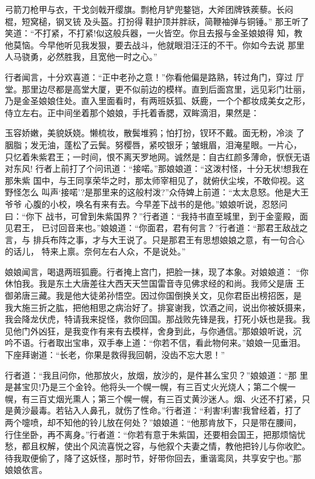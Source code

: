 弓箭刀枪甲与衣，干戈剑戟开缨旗。剽枪月铲兜鍪铠，大斧团牌铁蒺藜。长闷
棍，短窝槌，钢叉铳及头盔。打扮得鞋护顶并胖祆，简鞭袖弹与铜锤。”
那王听了笑道：“不打紧，不打紧!似这般兵器，一火皆空。你且去报与金圣娘娘得
知，教他莫恼。今早他听见我发狠，要去战斗，他就眼泪汪汪的不干。你如今去说
那里人马骁勇，必然胜我，且宽他一时之心。”

行者闻言，十分欢喜道：“正中老孙之意！”你看他偏是路熟，转过角门，穿过
厅堂。那里边尽都是高堂大厦，更不似前边的模样。直到后面宫里，远见彩门壮丽，
乃是金圣娘娘住处。直入里面看时，有两班妖狐、妖鹿，一个个都妆成美女之形，
侍立左右。正中间坐着那个娘娘，手托着香腮，双眸滴泪，果然是：

玉容娇嫩，美貌妖娆。懒梳妆，散鬓堆鸦；怕打扮，钗环不戴。面无粉，冷淡
了胭脂；发无油，蓬松了云鬓。努樱唇，紧咬银牙；皱蛾眉，泪淹星眼。一片心，
只忆着朱紫君王；一时间，恨不离天罗地网。诚然是：自古红颜多薄命，恹恹无语
对东风!
行者上前打了个问讯道：“接喏。”那娘娘道：“这泼村怪，十分无状!想我在那朱紫
国中，与王同享荣华之时，那太师宰相见了，就俯伏尘埃，不敢仰视。这野怪怎么
叫声‘接喏’?是那里来的这般村泼?”众侍婢上前道：“太太息怒。他是大王爷爷
心腹的小校，唤名有来有去。今早差下战书的是他。”娘娘听说，忍怒问曰：“你下
战书，可曾到朱紫国界？”行者道：“我持书直至城里，到于金銮殿，面见君王，
已讨回音来也。”娘娘道：“你面君，君有何言？”行者道：“那君王敌战之言，与
排兵布阵之事，才与大王说了。只是那君王有思想娘娘之意，有一句合心的话儿，
特来上禀。奈何左右人众，不是说处。”

娘娘闻言，喝退两班狐鹿。行者掩上宫门，把脸一抹，现了本象。对娘娘道：
“你休怕我。我是东土大唐差往大西天天竺国雷音寺见佛求经的和尚。我师父是唐
王御弟唐三藏。我是他大徒弟孙悟空。因过你国倒换关文，见你君臣出榜招医，是
我大施三折之肱，把他相思之病治好了。排宴谢我，饮酒之间，说出你被妖摄来，
我会降龙伏虎，特请我来捉怪，救你回国。那战败先锋是我，打死小妖也是我。我
见他门外凶狂，是我变作有来有去模样，舍身到此，与你通信。”那娘娘听说，沉
吟不语。行者取出宝串，双手奉上道：“你若不信，看此物何来。”娘娘一见垂泪。
下座拜谢道：“长老，你果是救得我回朝，没齿不忘大恩！”

行者道：“我且问你，他那放火，放烟，放沙的，是件甚么宝贝？”娘娘道：“那
里是甚宝贝!乃是三个金铃。他将头一个幌一幌，有三百丈火光烧人；第二个幌一
幌，有三百丈烟光熏人；第三个幌一幌，有三百丈黄沙迷人。烟、火还不打紧，只
是黄沙最毒。若钻入人鼻孔，就伤了性命。”行者道：“利害!利害!我曾经着，打了
两个嚏喷，却不知他的铃儿放在何处？”娘娘道：“他那肯放下，只是带在腰间，
行住坐卧，再不离身。”行者道：“你若有意于朱紫国，还要相会国王，把那烦恼忧
愁，都且权解，使出个风流喜悦之容，与他叙个夫妻之情，教他把铃儿与你收贮。
待我取便偷了，降了这妖怪，那时节，好带你回去，重谐鸾凤，共享安宁也。”那
娘娘依言。

